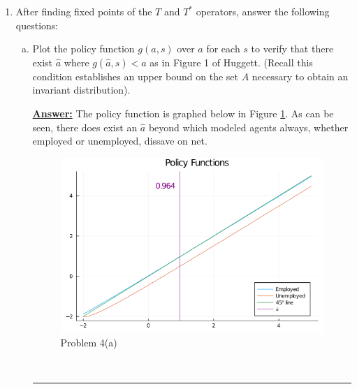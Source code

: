 \documentclass{article} %
\theoremstyle{definition}
\newenvironment{solution}[1][Answer]{\begin{singlespace}\underline{\textbf{#1:}}\quad }{\ \rule{0.3em}{0.3em}\end{singlespace}} %
\begin{document}
\begin{enumerate}[I.]
		\begin{enumerate}[4.]
			\item After finding fixed points of the $ T $ and $ T^* $ operators, answer the following questions:
			\begin{enumerate}[a.]
				\item  Plot the policy function $ g(a, s) $ over $ a $ for each $ s $ to verify that there exist $ \hat{a} $ where
				$ g(\hat{a}, s) < \hat{a} $ as in Figure 1 of Huggett. (Recall this condition establishes an upper bound on
				the set $ A $ necessary to obtain an invariant distribution).
				\begin{solution}
					The policy function is graphed below in Figure \ref{4a}. As can be seen, there does exist an $\hat{a}$ beyond which modeled agents always, whether employed or unemployed, dissave on net.
					\begin{figure}[htbp!]
					\centering
					\includegraphics[scale=.5]{ForIncludingInDocument/02_ryan_Policy_Functions.png}
					\caption{Problem 4(a) \label{4a}}
					\end{figure}
				\end{solution}


\end{enumerate}
\end{enumerate}
\end{enumerate}
\end{document}
